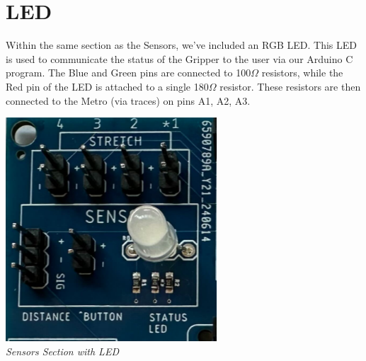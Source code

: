 \documentclass{article}
\begin{document}
\section{LED}
Within the same section as the Sensors, we've included an RGB LED. This LED is used to communicate the status of the Gripper to the user via our Arduino C program. The Blue and Green pins are connected to 100$\Omega$ resistors, while the Red pin of the LED is attached to a single 180$\Omega$ resistor. These resistors are then connected to the Metro (via traces) on pins A1, A2, A3. 
\begin{center}
    \includegraphics[scale=.80]{Images/SensorsSection.png}
    \\[1ex] %
    \textit{Sensors Section with LED}
\end{center}
\end{document}

